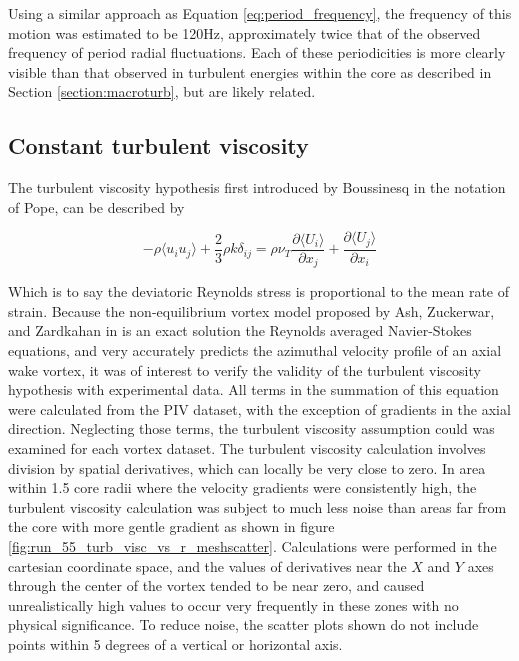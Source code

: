 










Using a similar approach as Equation \ref{eq:period_frequency}, the frequency 
of this motion was estimated to be 120Hz, approximately twice that of the 
observed frequency of period radial fluctuations. Each of these periodicities 
is more clearly visible than that observed in turbulent energies within the 
core as described in Section \ref{section:macroturb}, but are likely related.


\subsection{Constant turbulent viscosity}
The turbulent viscosity hypothesis first introduced by 
Boussinesq \cite{pope2000} in the notation of Pope, can be described by

\begin{equation}
-\rho \langle u_i u_j \rangle + \frac{2}{3}\rho k \delta_{ij} = \rho \nu_T
\frac{\partial \langle U_i \rangle}{\partial x_j} + \frac{\partial \langle U_j 
\rangle}{\partial x_i}
\end{equation} 

\noindent
Which is to say the deviatoric Reynolds stress is proportional to the mean rate 
of strain. Because the non-equilibrium vortex model proposed by Ash, Zuckerwar, 
and Zardkahan in \cite{ash2011} is an exact solution the Reynolds averaged 
Navier-Stokes equations, and very accurately predicts the azimuthal velocity 
profile of an axial wake vortex, it was of interest to verify the validity of 
the turbulent viscosity hypothesis with experimental data. All terms in the 
summation of this equation were calculated from the PIV dataset, with the 
exception of gradients in the axial direction. Neglecting those terms, the 
turbulent viscosity assumption could was examined for each vortex dataset. The 
turbulent viscosity calculation involves division by spatial derivatives, which 
can locally be very close to zero. In area within 1.5 core radii where the 
velocity gradients were consistently high, the turbulent viscosity calculation 
was subject to much less noise than areas far from the core with more gentle 
gradient as shown in figure \ref{fig:run_55_turb_visc_vs_r_meshscatter}. 
Calculations were performed in the cartesian coordinate space, and the values 
of derivatives near the $X$ and $Y$ axes through the center of the vortex 
tended to be near zero, and caused unrealistically high values to occur very 
frequently in these zones with no physical significance. To reduce noise, the 
scatter plots shown do not include points within 5 degrees of a vertical or 
horizontal axis.

